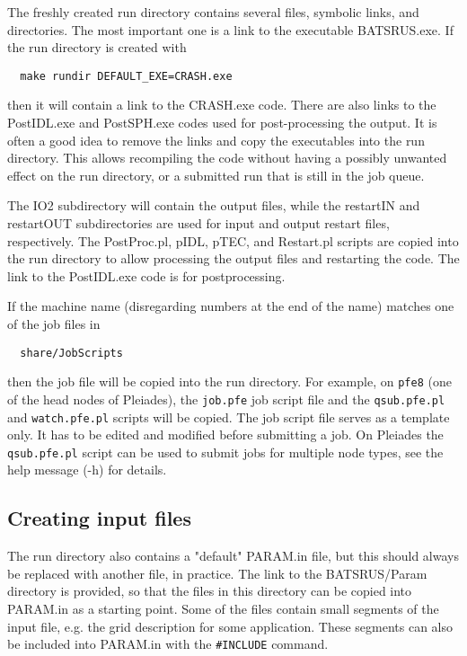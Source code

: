 The freshly created run directory contains several files, symbolic links, 
and directories. The most important one is a link to the executable BATSRUS.exe. 
If the run directory is created with
\begin{verbatim}
  make rundir DEFAULT_EXE=CRASH.exe
\end{verbatim}
then it will contain a link to the CRASH.exe code. There are also links to
the PostIDL.exe and PostSPH.exe codes used for post-processing the output.
It is often a good idea to remove the links and copy the executables into
the run directory. This allows recompiling the code without having a possibly
unwanted effect on the run directory, or a submitted run that is still in 
the job queue.

The IO2 subdirectory will contain the output files, while the restartIN and restartOUT
subdirectories are used for input and output restart files, respectively.
The PostProc.pl, pIDL, pTEC, and Restart.pl scripts are copied into the 
run directory to allow processing the output files and restarting the code.
The link to the PostIDL.exe code is for postprocessing.

If the machine name (disregarding numbers at the end of the name) matches 
one of the job files in 
\begin{verbatim}
  share/JobScripts
\end{verbatim}
then the job file will be copied
into the run directory. For example, on {\tt pfe8} (one of the head nodes 
of Pleiades), the {\tt job.pfe} job script file and the {\tt qsub.pfe.pl}
and {\tt watch.pfe.pl} scripts will be copied. The job script file serves as a
template only. It has to be edited and modified before submitting a job.
On Pleiades the {\tt qsub.pfe.pl} script can be used to submit jobs for
multiple node types, see the help message (-h) for details.

\subsection{Creating input files}

The run directory also contains a "default" PARAM.in file, but this should always
be replaced with another file, in practice.
The link to the BATSRUS/Param directory is provided, so that the files in
this directory can be copied into PARAM.in as a starting point. 
Some of the files contain small segments of the input file, e.g. the grid
description for some application. These segments can also be included
into PARAM.in with the {\tt \#INCLUDE} command.

